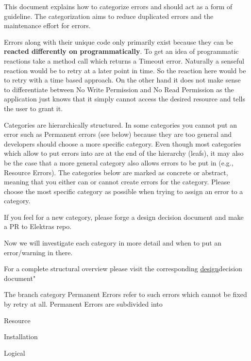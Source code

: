 This document explains how to categorize errors and should act as a form of guideline. The categorization aims to reduce duplicated errors and the maintenance effort for errors.

Errors along with their unique code only primarily exist because they can be {\bfseries reacted differently on programmatically}. To get an idea of programmatic reactions take a method call which returns a {\ttfamily Timeout} error. Naturally a senseful reaction would be to retry at a later point in time. So the reaction here would be to retry with a time based approach. On the other hand it does not make sense to differentiate between {\ttfamily No Write Permission} and {\ttfamily No Read Permission} as the application just knows that it simply cannot access the desired resource and tells the user to grant it.

Categories are hierarchically structured. In some categories you cannot put an error such as {\ttfamily Permanent errors} (see below) because they are too general and developers should choose a more specific category. Even though most categories which allow to put errors into are at the end of the hierarchy (leafs), it may also be the case that a more general category also allows errors to be put in (e.\+g., {\ttfamily Resource Errors}). The categories below are marked as {\ttfamily concrete} or {\ttfamily abstract}, meaning that you either can or cannot create errors for the category. Please choose the most specific category as possible when trying to assign an error to a category.

If you feel for a new category, please forge a design decision document and make a PR to Elektra\textquotesingle{}s repo.

Now we will investigate each category in more detail and when to put an error/warning in there.

For a complete structural overview please visit the corresponding \hyperlink{doc_decisions_error_codes_md}{design}decision document"

The branch category {\ttfamily Permanent Errors} refer to such errors which cannot be fixed by retry at all. {\ttfamily Permanent Errors} are subdivided into


\begin{DoxyItemize}
\item Resource
\item Installation
\item Logical
\end{DoxyItemize}

